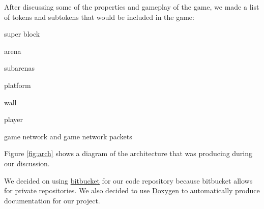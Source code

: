After discussing some of the properties and gameplay of the game, we made a
list of tokens and subtokens that would be included in the game:
\bitem
	\item super block
	\item arena
	\bitem
		\item subarenas
		\item platform
		\item wall
	\eitem
	\item player
	\item game network and game network packets
\eitem


Figure \ref{fig:arch} shows a diagram of the architecture that was producing
during our discussion.



We decided on using \href{https://bitbucket.org/}{bitbucket} for our code
repository because bitbucket allows for private repositories. We also decided
to use \href{http://www.stack.nl/~dimitri/doxygen/}{Doxygen} to automatically
produce documentation for our project.
